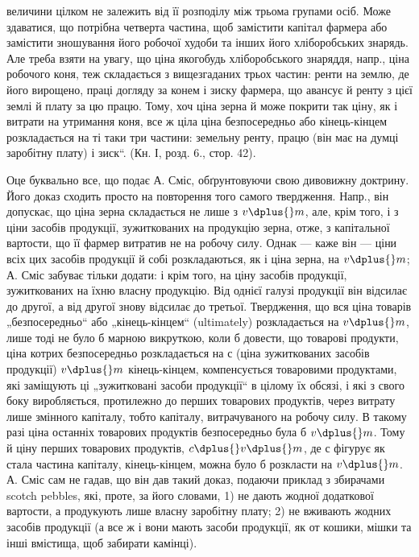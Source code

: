 \parcont{}  %
величини цілком не залежить від її розподілу між трьома групами осіб.
Може здаватися, що потрібна четверта частина, щоб замістити капітал
фармера або замістити зношування його робочої худоби та інших
його хліборобських знарядь. Але треба взяти на увагу, що ціна якогобудь
хліборобського знаряддя, напр., ціна робочого коня, теж складається
з вищезгаданих трьох частин: ренти на землю, де його вирощено,
праці догляду за конем і зиску фармера, що авансує й ренту з цієї
землі й плату за цю працю. Тому, хоч ціна зерна й може покрити так
ціну, як і витрати на утримання коня, все ж ціла ціна безпосередньо
або кінець-кінцем розкладається на ті таки три частини: земельну ренту,
працю (він має на думці заробітну плату) і зиск“. (Кн. І, розд. 6.,
стор. 42).

Оце буквально все, що подає А. Сміс, обґрунтовуючи свою дивовижну
доктрину. Його доказ сходить просто на повторення того самого
твердження. Напр., він допускає, що ціна зерна складається не лише з
$v \dplus{} m$, але, крім того, і з ціни засобів продукції, зужиткованих на продукцію
зерна, отже, з капітальної вартости, що її фармер витратив не
на робочу силу. Однак — каже він — ціни всіх цих засобів продукції й
собі розкладаються, як і ціна зерна, на $v \dplus{} m$; А. Сміс забуває тільки
додати: і крім того, на ціну засобів продукції, зужиткованих на їхню
власну продукцію. Від однієї галузі продукції він відсилає до другої, а
від другої знову відсилає до третьої. Твердження, що вся ціна товарів
„безпосередньо“ або „кінець-кінцем“ (ultimately) розкладається на $v \dplus{} m$,
лише тоді не було б марною викруткою, коли б довести, що товарові
продукти, ціна котрих безпосередньо розкладається на с (ціна зужиткованих
засобів продукції) \dplus{} $v \dplus{} m$ кінець-кінцем, компенсується товаровими
продуктами, які заміщують ці „зужитковані засоби продукції“ в
цілому їх обсязі, і які з свого боку виробляється, протилежно до перших
товарових продуктів, через витрату лише змінного капіталу, тобто
капіталу, витрачуваного на робочу силу. В такому разі ціна останніх
товарових продуктів безпосередньо була б \deq{} $v \dplus{} m$. Тому й ціну перших
товарових продуктів, $c \dplus{} v \dplus{} m$, де с фігурує як стала частина
капіталу, кінець-кінцем, можна було б розкласти на $v \dplus{} m$. А. Сміс сам
не гадав, що він дав такий доказ, подаючи приклад з збирачами scotch
pebbles, які, проте, за його словами, 1) не дають жодної додаткової вартости,
а продукують лише власну заробітну плату; 2) не вживають жодних
засобів продукції (а все ж і вони мають засоби продукції, як от
кошики, мішки та інші вмістища, щоб забирати камінці).

